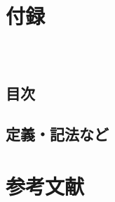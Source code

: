 \documentclass[
  unicode,a4paper,10pt,
  xcolor = {dvipsnames,svgnames},
  hyperref ={colorlinks=true,citecolor=Navy,linkcolor=NavyBlue,urlcolor=purple},
  ja=standard,lualatex
]{beamer}
\begin{document}
\renewcommand{\thefigure}{\thesubsection.\arabic{figure}}

\renewcommand{\thetable}{\thesubsection.\arabic{table}}
\makeatother

\section{付録}

\begin{frame}[plain]
  \frametitle{\ }
  \huge \secname
\end{frame}

\subsection{目次}

\begin{frame}[plain]{\subsecname}
  \tableofcontents
\end{frame}


\subsection{定義・記法など}


\begin{frame}

  

\end{frame}


\section{参考文献}
\begin{frame}{\secname}

  \scriptsize
  \beamertemplatetextbibitems
  
  

\end{frame}

\setcounter{framenumber}{\value{Appendix}}
\end{document}
